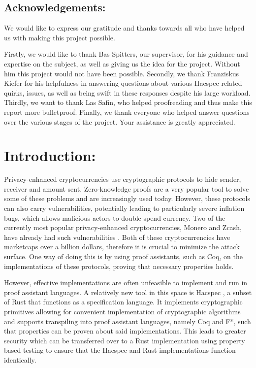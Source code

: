 \documentclass{article}
\begin{document}
\subsection*{Acknowledgements:}

We would like to express our gratitude and thanks towards all who have
helped us with making this project possible.

Firstly, we would like to thank Bas Spitters, our supervisor,
for his guidance and expertise on the subject, as well as giving
us the idea for the project. Without him this project would not
have been possible. Secondly, we thank Franziskus Kiefer for his
helpfulness in answering questions about various Hacspec-related
quirks, issues, as well as being swift in these responses despite
his large workload. Thirdly, we want to thank Las Safin, who helped
proofreading and thus make this report more bulletproof. Finally, we
thank everyone who helped answer questions over the various stages of
the project. Your assistance is greatly appreciated.

\newpage
\tableofcontents

\newpage


\section{Introduction:} \label{Introduction}

Privacy-enhanced cryptocurrencies use cryptographic protocols to hide
sender, receiver and amount sent. Zero-knowledge proofs are a very
popular tool to solve some of these problems and are increasingly
used today. However, these protocols can also carry vulnerabilities,
potentially leading to particularly severe inflation bugs, which
allows malicious actors to double-spend currency. Two of the currently
most popular privacy-enhanced cryptocurrencies, Monero and Zcash, have
already had such vulnerabilities \cite{cryptonote} \cite{zcash}. Both of
these cryptocurrencies have marketcaps over a billion dollars, therefore
it is crucial to minimize the attack surface. One way of doing this
is by using proof assistants, such as Coq, on the implementations of
these protocols, proving that necessary properties holds.

However, effective implementations are often unfeasible to implement
and run in proof assistant languages. A relatively new tool in this
space is Hacspec \cite{hacspec}, a subset of Rust that functions
as a specification language. It implements cryptographic primitives
allowing for convenient implementation of cryptographic algorithms and
supports transpiling into proof assistant languages, namely Coq and F*,
such that properties can be proven about said implementations. This
leads to greater security which can be transferred over to a Rust
implementation using property based testing to ensure that the Hacspec
and Rust implementations function identically.
\end{document}
